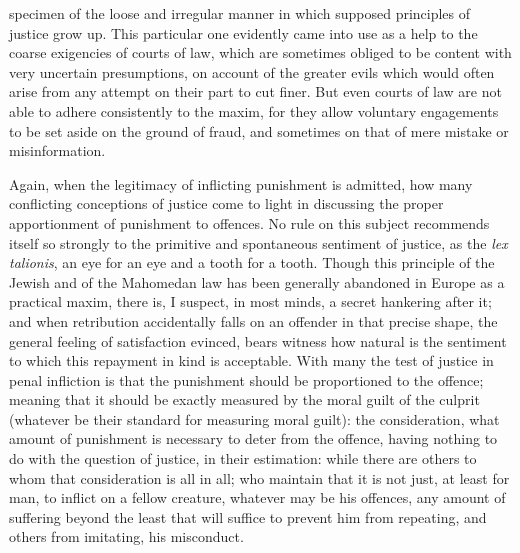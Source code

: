 \documentclass[12pt]{report}
\begin{document}
specimen of the loose and irregular manner in which supposed principles of justice grow up. This particular one evidently came into use as a help to the coarse exigencies of courts of law, which are sometimes obliged to be content with very uncertain presumptions, on account of the greater evils which would often arise from any attempt on their part to cut finer. But even courts of law are not able to adhere consistently to the maxim, for they allow voluntary engagements to be set aside on the ground of fraud, and sometimes on that of mere mistake or misinformation.

Again, when the legitimacy of inflicting punishment is admitted, how many conflicting conceptions of justice come to light in discussing the proper apportionment of punishment to offences. No rule on this subject recommends itself so strongly to the primitive and spontaneous sentiment of justice, as the \emph{lex talionis}, an eye for an eye and a tooth for a tooth. Though this principle of the Jewish and of the Mahomedan law has been generally abandoned in Europe as a practical maxim, there is, I suspect, in most minds, a secret hankering after it; and when retribution accidentally falls on an offender in that precise shape, the general feeling of satisfaction evinced, bears witness how natural is the sentiment to which this repayment in kind is acceptable. With many the test of justice in penal infliction is that the punishment should be proportioned to the offence; meaning that it should be exactly measured by the moral guilt of the culprit (whatever be their standard for measuring moral guilt): the consideration, what amount of punishment is necessary to deter from the offence, having nothing to do with the question of justice, in their estimation: while there are others to whom that consideration is all in all; who maintain that it is not just, at least for man, to inflict on a fellow creature, whatever may be his offences, any amount of suffering beyond the least that will suffice to prevent him from repeating, and others from imitating, his misconduct.
\end{document}

